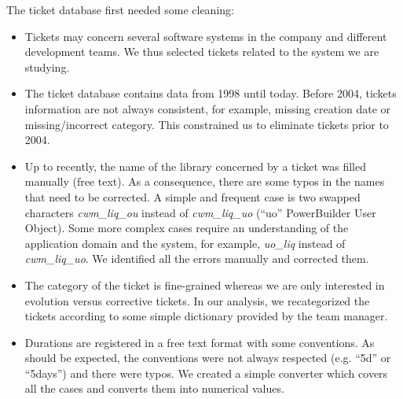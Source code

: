\documentclass[10pt,conference]{IEEEtran}
\begin{document}
The ticket database first needed some cleaning:
\begin{itemize}
  \item Tickets may concern several software systems in the company and different development teams.
  We thus selected tickets related to the system we are studying.
  
  \item The ticket database contains data from 1998  until today. 
  Before 2004, tickets information are not always consistent, for example, missing creation date or missing/incorrect category.
  This constrained us to eliminate tickets prior to 2004.

  \item Up to recently, the name of the library concerned by a ticket was filled manually (free text).
  As a consequence, there are some typos in the names that need to be corrected.
  A simple and frequent case is two swapped characters \emph{cwm\_liq\_ou} instead of \emph{cwm\_liq\_uo} (``uo'' PowerBuilder User Object).
  Some more complex cases require an understanding of the application domain and the system, for example, \emph{uo\_liq} instead of \emph{cwm\_liq\_uo}.
  We identified all the errors manually and corrected them.
  
  \item The category of the ticket is fine-grained whereas we are only interested in evolution versus corrective tickets.
  In our analysis, we recategorized the tickets according to some simple dictionary provided by the team manager.

  \item Durations are registered in a free text format with some conventions.
  As should be expected, the conventions were not always respected (e.g. ``5d'' or ``5days'') and there were typos.
  We created a simple  converter which covers all the cases and converts them into numerical values.
  
\end{itemize}
 
\end{document}
